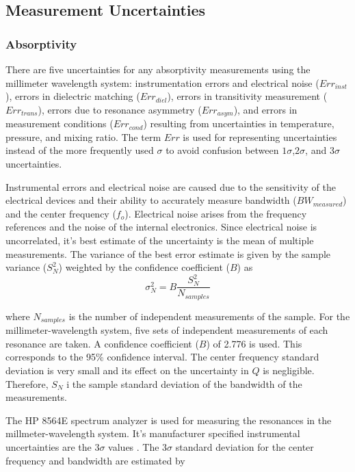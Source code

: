 \subsection{Measurement Uncertainties}


\subsubsection{Absorptivity}

There are five uncertainties for any absorptivity measurements using the millimeter wavelength system: instrumentation errors and electrical noise ($Err_{inst}$), errors in dielectric matching ($Err_{diel}$), errors in transitivity measurement ($Err_{trans}$), errors due to resonance asymmetry ($Err_{asym}$), and errors in measurement conditions ($Err_{cond}$) resulting from uncertainties in temperature, pressure, and mixing ratio. The term $Err$ is used for representing uncertainties instead of the more frequently used $\sigma$ to avoid confusion between $1\sigma$,$2\sigma$, and $3\sigma$ uncertainties.

Instrumental errors and electrical noise are caused due to the sensitivity of the electrical devices and their ability to accurately measure bandwidth ($BW_{measured}$) and the center frequency ($f_o$). Electrical noise arises from the frequency references and the noise of the internal electronics. Since electrical noise is uncorrelated, it's best estimate of the uncertainty is the mean of multiple measurements. The variance of the best error estimate is given by the sample variance ($S^2_N$) weighted by the confidence coefficient ($B$) as
\begin{equation}\label{eq:sigman}
\sigma^2_N = B \frac{S^2_N}{N_{samples}}
\end{equation}

\noindent where $N_{samples}$ is the number of independent measurements of the sample. For the millimeter-wavelength system, five sets of independent measurements of each resonance are taken. A confidence coefficient ($B$) of 2.776 is used. This corresponds to the 95\% confidence interval. The center frequency standard deviation is very small and its effect on the uncertainty in $Q$ is negligible. Therefore, $S_N$ i the sample standard deviation of the bandwidth of the measurements.

The HP 8564E spectrum analyzer is used for measuring the resonances in the millmeter-wavelength system. It's manufacturer specified instrumental uncertainties are the $3\sigma$ values \cite{Hewlett-Packard}. The $3\sigma$ standard deviation for the center frequency and bandwidth are estimated by 

